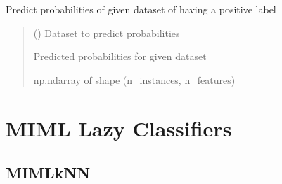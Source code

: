 \documentclass[letterpaper,10pt,english]{sphinxmanual}
\begin{document}
\begin{fulllineitems}
\begin{fulllineitems}
\label{\detokenize{classifier/mimlTOmi/_autosummary/miml.classifier.mimlTOmi.miml_to_mi_lp_classifier.MIMLtoMILPClassifier:miml.classifier.mimlTOmi.miml_to_mi_lp_classifier.MIMLtoMILPClassifier.predict_proba}}
\pysigstartsignatures
\pysiglinewithargsret
{}
{}
{}
\pysigstopsignatures
\sphinxAtStartPar
Predict probabilities of given dataset of having a positive label
\begin{quote}\begin{description}
\sphinxAtStartPar
{} ({\hyperref[\detokenize{data/_autosummary/miml.data.miml_dataset.MIMLDataset:miml.data.miml_dataset.MIMLDataset}]{}}) \textendash{} Dataset to predict probabilities

\sphinxAtStartPar
{} \textendash{} Predicted probabilities for given dataset

\sphinxAtStartPar
np.ndarray of shape (n\_instances, n\_features)

\end{description}\end{quote}

\end{fulllineitems}


\end{fulllineitems}


\sphinxstepscope


\section{MIML Lazy Classifiers}
\label{\detokenize{classifier/lazy/index:miml-lazy-classifiers}}\label{\detokenize{classifier/lazy/index::doc}}

\subsection{MIML\sphinxhyphen{}kNN}
\label{\detokenize{classifier/lazy/index:miml-knn}}
\end{document}
